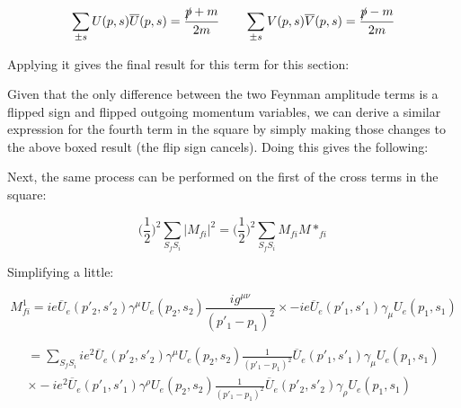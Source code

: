 \documentclass[a4]{article}
\begin{document}
    \begin{equation}
        \sum_{\pm s} U (p, s) \overline{U} (p, s) = \frac{\slashed{p} + m}{2m} \qquad \sum_{\pm s} V (p, s) \overline{V} (p, s) = \frac{\slashed{p} - m}{2m}
    \end{equation}

    Applying it gives the final result for this term for this section:

    \begin{center}
    \end{center}

    Given that the only difference between the two Feynman amplitude terms is a flipped sign and flipped outgoing momentum variables, we can derive a similar expression for the fourth term in the square by simply making those changes
    to the above boxed result (the flip sign cancels). Doing this gives the following:

    \begin{center}
    \end{center}

    Next, the same process can be performed on the first of the cross terms in the square:

    \begin{equation}
        \bigg( \frac{1}{2} \bigg)^2 \sum_{S_f S_i} |M_{f i}|^2 = \bigg( \frac{1}{2} \bigg)^2 \sum_{S_f S_i} M_{fi} M*_{fi}
    \end{equation}

    Simplifying a little:

    \begin{equation}
        M_{fi}^1 = i e \overline{U}_e (p'_2, s'_2) \gamma^{\mu} U_e (p_2, s_2) \frac{i g^{\mu \nu}}{(p'_1 - p_1)^2} \times - i e \overline{U}_e (p'_1, s'_1) \gamma_{\mu} U_e (p_1, s_1)
    \end{equation}

    \begin{eqnarray}
        = \sum_{S_f S_i} i e^2 \overline{U}_e (p'_2, s'_2) \gamma^{\mu} U_e (p_2, s_2) \frac{1}{(p'_1 - p_1)^2} \overline{U}_e (p'_1, s'_1) \gamma_{\mu} U_e (p_1, s_1) \\
        \times - i e^2 \overline{U}_e (p'_1, s'_1) \gamma^{\rho} U_e (p_2, s_2) \frac{1}{(p'_1 - p_1)^2} \overline{U}_e (p'_2, s'_2) \gamma_{\rho} U_e (p_1, s_1)
    \end{eqnarray}
\end{document}
